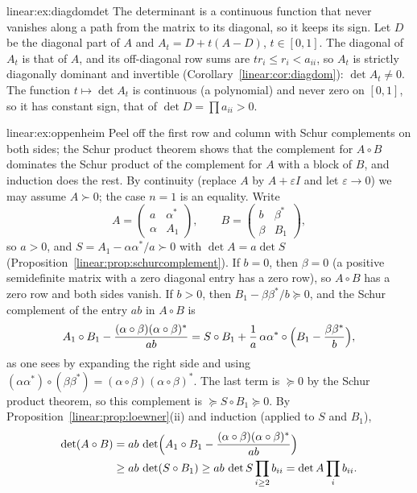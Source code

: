 \begin{solution}{linear:ex:diagdomdet}
\idea The determinant is a continuous function that never vanishes along a path from the matrix to its diagonal, so it keeps its sign.
\writeup Let $D$ be the diagonal part of $A$ and $A_t=D+t(A-D)$, $t\in[0,1]$. The diagonal of $A_t$ is that of $A$, and its off-diagonal
row sums are $tr_i\le r_i<a_{ii}$, so $A_t$ is strictly diagonally dominant and invertible (Corollary~\ref{linear:cor:diagdom}): $\det A_t\ne0$. The
function $t\mapsto\det A_t$ is continuous (a polynomial) and never zero on $[0,1]$, so it has constant sign, that of $\det D=\prod a_{ii}>0$.
\end{solution}

\begin{solution}{linear:ex:oppenheim}
\idea Peel off the first row and column with Schur complements on both sides; the Schur product theorem shows that the complement
for $A\circ B$ dominates the Schur product of the complement for $A$ with a block of $B$, and induction does the rest.
\writeup By continuity (replace $A$ by $A+\varepsilon I$ and let $\varepsilon\to0$) we may assume $A\succ0$; the case $n=1$ is an equality.
Write
\[
A=\begin{pmatrix}a&\alpha^*\\\alpha&A_1\end{pmatrix},\qquad B=\begin{pmatrix}b&\beta^*\\\beta&B_1\end{pmatrix},
\]
so $a>0$, and $S=A_1-\alpha\alpha^*/a\succ0$ with $\det A=a\det S$ (Proposition~\ref{linear:prop:schurcomplement}). If $b=0$, then $\beta=0$ (a
positive semidefinite matrix with a zero diagonal entry has a zero row), so $A\circ B$ has a zero row and both sides vanish. If $b>0$,
then $B_1-\beta\beta^*/b\succeq0$, and the Schur complement of the entry $ab$ in $A\circ B$ is
\[
A_1\circ B_1-\frac{(\alpha\circ\beta)(\alpha\circ\beta)^*}{ab}=S\circ B_1+\frac1a\,\alpha\alpha^*\circ\Bigl(B_1-\frac{\beta\beta^*}b\Bigr),
\]
as one sees by expanding the right side and using $(\alpha\alpha^*)\circ(\beta\beta^*)=(\alpha\circ\beta)(\alpha\circ\beta)^*$. The last term is
$\succeq0$ by the Schur product theorem, so this complement is $\succeq S\circ B_1\succeq0$. By Proposition~\ref{linear:prop:loewner}(ii) and
induction (applied to $S$ and $B_1$),
\[
\begin{aligned}
\det(A\circ B)&=ab\,\det\Bigl(A_1\circ B_1-\frac{(\alpha\circ\beta)(\alpha\circ\beta)^*}{ab}\Bigr)\\
&\ge ab\,\det(S\circ B_1)\ge ab\,\det S\prod_{i\ge2}b_{ii}=\det A\prod_ib_{ii}.
\end{aligned}
\]
\end{solution}

